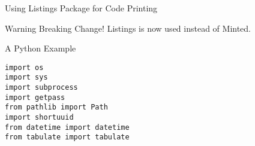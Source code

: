 \documentclass[\string~/GitHub/sthlmNordBeamerTheme/sthlmNordLightDemo.tex]{subfiles}
\begin{document}
\begin{frame}{Using Listings Package for Code Printing}



\begin{alertblock}{Warning}
  Breaking Change!  Listings is now used instead of Minted.
\end{alertblock}
\end{frame}


\begin{frame}{A Python Example}

\begin{verbatim}
import os
import sys
import subprocess
import getpass
from pathlib import Path
import shortuuid
from datetime import datetime
from tabulate import tabulate
\end{verbatim}
\end{frame}
\end{document}
